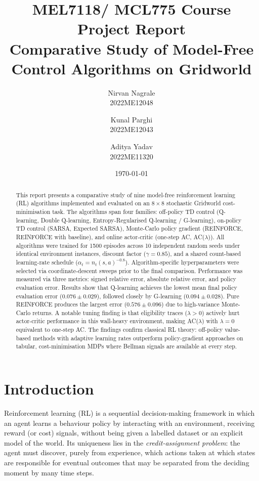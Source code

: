 \documentclass[11pt]{article}
\title{\textbf{MEL7118/ MCL775 Course Project Report}\\[0.5em]
\large Comparative Study of Model-Free Control Algorithms on Gridworld}
\author{
    Nirvan Nagrale \\
    2022ME12048 \\
    \and
    Kunal Parghi \\
    2022ME12043\\
    \and
    Aditya Yadav \\
    2022ME11320
}
\date{\today}
\begin{document}
\maketitle

\begin{abstract}
This report presents a comparative study of nine model-free reinforcement learning
(RL) algorithms implemented and evaluated on an $8\times8$ stochastic
Gridworld cost-minimisation task.  The algorithms span four families: off-policy
TD control (Q-learning, Double Q-learning, Entropy-Regularised Q-learning /
G-learning), on-policy TD control (SARSA, Expected SARSA), Monte-Carlo policy
gradient (REINFORCE, REINFORCE with baseline), and online actor-critic
(one-step AC, AC($\lambda$)).  All algorithms were trained for 1500 episodes
across 10 independent random seeds under identical environment instances,
discount factor ($\gamma = 0.85$), and a shared count-based learning-rate
schedule ($\alpha_t = n_t(s,a)^{-0.8}$).  Algorithm-specific hyperparameters
were selected via coordinate-descent sweeps prior to the final comparison.
Performance was measured via three metrics: signed relative error, absolute
relative error, and policy evaluation error.  Results show that Q-learning
achieves the lowest mean final policy evaluation error ($0.076 \pm 0.029$),
followed closely by G-learning ($0.094 \pm 0.028$).  Pure REINFORCE produces
the largest error ($0.576 \pm 0.096$) due to high-variance Monte-Carlo returns.
A notable tuning finding is that eligibility traces ($\lambda>0$) actively hurt
actor-critic performance in this wall-heavy environment, making AC($\lambda$)
with $\lambda=0$ equivalent to one-step AC.  The findings confirm classical RL
theory: off-policy value-based methods with adaptive learning rates outperform
policy-gradient approaches on tabular, cost-minimisation MDPs where Bellman
signals are available at every step.
\end{abstract}

\section{Introduction}

Reinforcement learning (RL) is a sequential decision-making framework in which
an agent learns a behaviour policy by interacting with an environment, receiving
reward (or cost) signals, without being given a labelled dataset or an
explicit model of the world.  Its uniqueness lies in the \emph{credit-assignment
problem}: the agent must discover, purely from experience, which actions taken
at which states are responsible for eventual outcomes that may be separated from
the deciding moment by many time steps.
\end{document}
